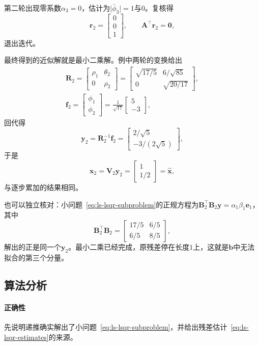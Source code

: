 \begin{enumerate}
 第二轮出现零系数$\alpha_3=0$，估计为$\lvert\bar\phi_3\rvert=1$与$0$。复核得
 \[
  \bm r_2=\begin{bmatrix}0\\0\\1\end{bmatrix},\qquad \bm A^\top\bm r_2=\bm0 ,
 \]
 退出迭代。
\end{enumerate}

最终得到的近似解就是最小二乘解。例中两轮的变换给出
\[
 \begin{gathered}
 \bm R_2=\begin{bmatrix}\rho_1&\theta_2\\0&\rho_2\end{bmatrix}
 =\begin{bmatrix}\sqrt{17/5}&6/\sqrt{85}\\0&\sqrt{20/17}\end{bmatrix},\\
 \bm f_2=\begin{bmatrix}\phi_1\\\phi_2\end{bmatrix}=\frac1{\sqrt{17}}\begin{bmatrix}5\\-3\end{bmatrix},
 \end{gathered}
\]
回代得
\[
 \bm y_2=\bm R_2^{-1}\bm f_2=\begin{bmatrix}2/\sqrt5\\-3/(2\sqrt5)\end{bmatrix},
\]
于是
\[
 \bm x_2=\bm V_2\bm y_2=\begin{bmatrix}1\\1/2\end{bmatrix}=\hat{\bm x},
\]
与逐步累加的结果相同。

也可以独立核对：小问题~\eqref{eq:ls-lsqr-subproblem}的正规方程为$\bm B_2^\top\bm B_2\bm y=\alpha_1\beta_1\bm e_1$，其中
\[
 \bm B_2^\top\bm B_2=\begin{bmatrix}17/5&6/5\\6/5&8/5\end{bmatrix},
\]
解出的正是同一个$\bm y_2$。最小二乘已经完成，原残差停在长度$1$上，这就是$\bm b$中无法拟合的第三个分量。

\subsection{算法分析}

\paragraph{正确性}
先说明递推确实解出了小问题~\eqref{eq:ls-lsqr-subproblem}，并给出残差估计~\eqref{eq:ls-lsqr-estimates}的来源。

